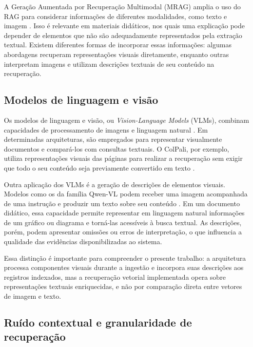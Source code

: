A Geração Aumentada por Recuperação Multimodal (MRAG) amplia o uso do RAG para considerar informações de diferentes modalidades, como texto e imagem . Isso é relevante em materiais didáticos, nos quais uma explicação pode depender de elementos que não são adequadamente representados pela extração textual. Existem diferentes formas de incorporar essas informações: algumas abordagens recuperam representações visuais diretamente, enquanto outras interpretam imagens e utilizam descrições textuais de seu conteúdo na recuperação.

\subsection{Modelos de linguagem e visão}
\label{subsec:vlms_recuperacao}
\label{subsec:vlms_geradores}

Os modelos de linguagem e visão, ou \textit{Vision-Language Models} (VLMs), combinam capacidades de processamento de imagens e linguagem natural . Em determinadas arquiteturas, são empregados para representar visualmente documentos e compará-los com consultas textuais. O ColPali, por exemplo, utiliza representações visuais das páginas para realizar a recuperação sem exigir que todo o seu conteúdo seja previamente convertido em texto .

Outra aplicação dos VLMs é a geração de descrições de elementos visuais. Modelos como os da família Qwen-VL podem receber uma imagem acompanhada de uma instrução e produzir um texto sobre seu conteúdo . Em um documento didático, essa capacidade permite representar em linguagem natural informações de um gráfico ou diagrama e torná-las acessíveis à busca textual. As descrições, porém, podem apresentar omissões ou erros de interpretação, o que influencia a qualidade das evidências disponibilizadas ao sistema.

Essa distinção é importante para compreender o presente trabalho: a arquitetura processa componentes visuais durante a ingestão e incorpora suas descrições aos registros indexados, mas a recuperação vetorial implementada opera sobre representações textuais enriquecidas, e não por comparação direta entre vetores de imagem e texto.

\subsection{Ruído contextual e granularidade de recuperação}
\label{subsec:ruido_contextual}

